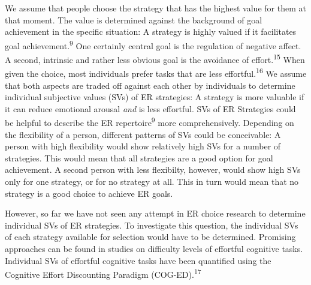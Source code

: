 \documentclass[
  english,
  man,floatsintext]{apa6}
\begin{document}
We assume that people choose the strategy that has the highest value for them at that moment.
The value is determined against the background of goal achievement in the specific situation: A strategy is highly valued if it facilitates goal achievement.\textsuperscript{9}
One certainly central goal is the regulation of negative affect.
A second, intrinsic and rather less obvious goal is the avoidance of effort.\textsuperscript{15}
When given the choice, most individuals prefer tasks that are less effortful.\textsuperscript{16}
We assume that both aspects are traded off against each other by individuals to determine individual subjective values (SVs) of ER strategies: A strategy is more valuable if it can reduce emotional arousal \emph{and} is less effortful.
SVs of ER Strategies could be helpful to describe the ER repertoire\textsuperscript{9} more comprehensively.
Depending on the flexibility of a person, different patterns of SVs could be conceivable: A person with high flexibility would show relatively high SVs for a number of strategies.
This would mean that all strategies are a good option for goal achievement.
A second person with less flexibilty, however, would show high SVs only for one strategy, or for no strategy at all.
This in turn would mean that no strategy is a good choice to achieve ER goals.

However, so far we have not seen any attempt in ER choice research to determine individual SVs of ER strategies.
To investigate this question, the individual SVs of each strategy available for selection would have to be determined.
Promising approaches can be found in studies on difficulty levels of effortful cognitive tasks.\\
Individual SVs of effortful cognitive tasks have been quantified using the Cognitive Effort Discounting Paradigm (COG-ED).\textsuperscript{17}
\end{document}
